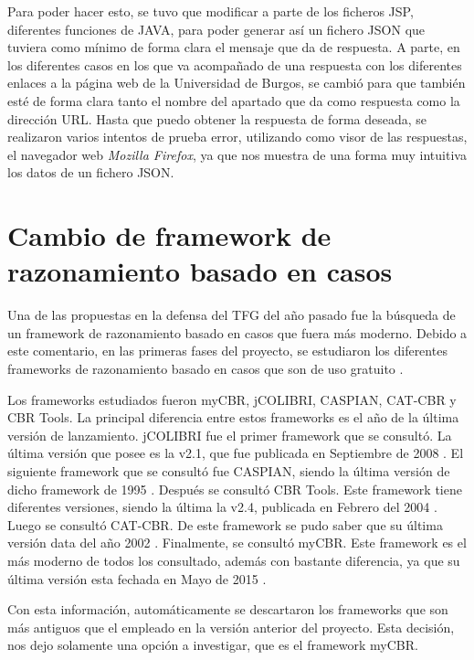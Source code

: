 Para poder hacer esto, se tuvo que modificar a parte de los ficheros JSP, diferentes funciones de JAVA, para poder generar así un fichero JSON que tuviera como mínimo de forma clara el mensaje que da de respuesta. A parte, en los diferentes casos en los que va acompañado de una respuesta con los diferentes enlaces a la página web de la Universidad de Burgos, se cambió para que también esté de forma clara tanto el nombre del apartado que da como respuesta como la dirección URL. Hasta que puedo obtener la respuesta de forma deseada, se realizaron varios intentos de prueba error, utilizando como visor de las respuestas, el navegador web \textit{Mozilla Firefox}, ya que nos muestra de una forma muy intuitiva los datos de un fichero JSON.

\section{Cambio de framework de razonamiento basado en casos}

Una de las propuestas en la defensa del TFG del año pasado fue la búsqueda de un framework de razonamiento basado en casos que fuera más moderno. Debido a este comentario, en las primeras fases del proyecto, se estudiaron los diferentes frameworks de razonamiento basado en casos que son de uso gratuito \cite{cbrcomp:art}.

Los frameworks estudiados fueron myCBR, jCOLIBRI, CASPIAN, CAT-CBR y CBR Tools. La principal diferencia entre estos frameworks es el año de la última versión de lanzamiento. jCOLIBRI fue el primer framework que se consultó. La última versión que posee es la v2.1, que fue publicada en Septiembre de 2008 \cite{jcolibri:info}. El siguiente framework que se consultó fue CASPIAN, siendo la última versión de dicho framework de 1995 \cite{caspian:info}. Después se consultó CBR Tools. Este framework tiene diferentes versiones, siendo la última la v2.4, publicada en Febrero del 2004 \cite{cbrtools:info}. Luego se consultó CAT-CBR. De este framework se pudo saber que su última versión data del año 2002 \cite{catcbr:info}. Finalmente, se consultó myCBR. Este framework es el más moderno de todos los consultado, además con bastante diferencia, ya que su última versión esta fechada en Mayo de 2015 \cite{mycbr:info}.

Con esta información, automáticamente se descartaron los frameworks que son más antiguos que el empleado en la versión anterior del proyecto. Esta decisión, nos dejo solamente una opción a investigar, que es el framework myCBR.


